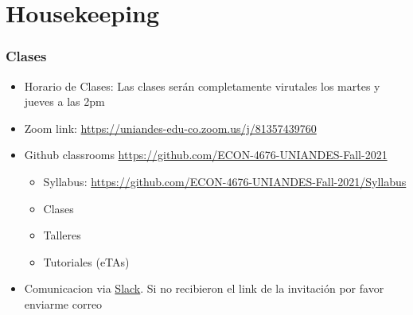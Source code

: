 \documentclass[
  shownotes,
  xcolor={svgnames},
  hyperref={colorlinks,citecolor=DarkBlue,linkcolor=DarkRed,urlcolor=DarkBlue}
  , aspectratio=169]{beamer}
\begin{document}
\section{Housekeeping}
\begin{frame}
\frametitle{Clases}


    \begin{itemize}
      \item Horario de Clases: Las clases serán completamente virutales los martes y jueves a las 2pm
      \bigskip
      \item Zoom link: \url{https://uniandes-edu-co.zoom.us/j/81357439760}
      \bigskip
      \item Github classrooms \url{https://github.com/ECON-4676-UNIANDES-Fall-2021}
      \begin{itemize}
        \item Syllabus: \url{https://github.com/ECON-4676-UNIANDES-Fall-2021/Syllabus}
        \item Clases
        \item Talleres
        \item Tutoriales (eTAs)
        \end{itemize}
      \bigskip
      \item Comunicacion via \href{https://slack.com/}{Slack}. Si no recibieron el link de la invitación por favor enviarme correo
    \end{itemize}


\end{frame}

\end{document}
